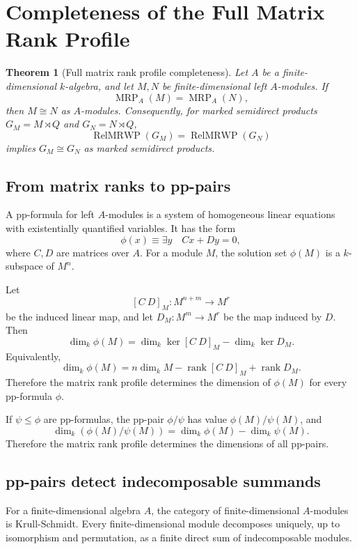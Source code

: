 \documentclass[11pt]{article}
\newtheorem{theorem}{Theorem}[section]
\begin{document}
\section{Completeness of the Full Matrix Rank Profile}

\begin{theorem}[Full matrix rank profile completeness]
Let $A$ be a finite-dimensional $k$-algebra, and let $M,N$ be finite-dimensional left $A$-modules. If
\[
\operatorname{MRP}_A(M)=\operatorname{MRP}_A(N),
\]
then $M\cong N$ as $A$-modules. Consequently, for marked semidirect products $G_M=M\rtimes Q$ and $G_N=N\rtimes Q$,
\[
\operatorname{RelMRWP}(G_M)=\operatorname{RelMRWP}(G_N)
\]
implies $G_M\cong G_N$ as marked semidirect products.
\end{theorem}

\subsection{From matrix ranks to pp-pairs}

A pp-formula for left $A$-modules is a system of homogeneous linear equations with existentially quantified variables. It has the form
\[
\phi(x)\equiv \exists y\quad Cx+Dy=0,
\]
where $C,D$ are matrices over $A$. For a module $M$, the solution set $\phi(M)$ is a $k$-subspace of $M^n$.

Let
\[
[C\ D]_M:M^{n+m}\to M^r
\]
be the induced linear map, and let $D_M:M^m\to M^r$ be the map induced by $D$. Then
\[
\dim_k\phi(M)
=
\dim_k\ker [C\ D]_M-\dim_k\ker D_M.
\]
Equivalently,
\[
\dim_k\phi(M)
=
n\dim_k M-\operatorname{rank}[C\ D]_M+\operatorname{rank}D_M.
\]
Therefore the matrix rank profile determines the dimension of $\phi(M)$ for every pp-formula $\phi$.

If $\psi\le\phi$ are pp-formulas, the pp-pair $\phi/\psi$ has value $\phi(M)/\psi(M)$, and
\[
\dim_k(\phi(M)/\psi(M))
=
\dim_k\phi(M)-\dim_k\psi(M).
\]
Therefore the matrix rank profile determines the dimensions of all pp-pairs.

\subsection{pp-pairs detect indecomposable summands}

For a finite-dimensional algebra $A$, the category of finite-dimensional $A$-modules is Krull-Schmidt. Every finite-dimensional module decomposes uniquely, up to isomorphism and permutation, as a finite direct sum of indecomposable modules.
\end{document}
